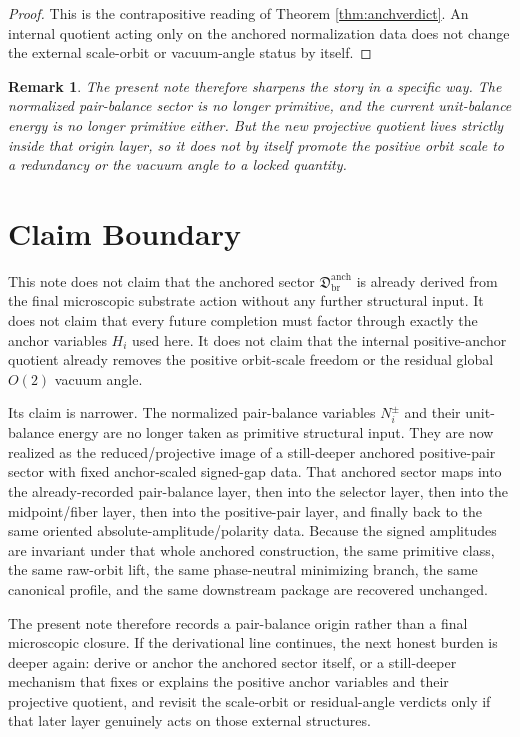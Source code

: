 \documentclass[11pt]{article}
\newcommand{\BalOriginSector}{\mathfrak D_{\mathrm{br}}^{\mathrm{anch}}}
\newtheorem{remark}{Remark}
\begin{document}
\begin{proof}
This is the contrapositive reading of Theorem \ref{thm:anchverdict}. An internal quotient acting only on the anchored normalization data does not change the external scale-orbit or vacuum-angle status by itself.
\end{proof}

\begin{remark}
The present note therefore sharpens the story in a specific way. The normalized pair-balance sector is no longer primitive, and the current unit-balance energy is no longer primitive either. But the new projective quotient lives strictly inside that origin layer, so it does not by itself promote the positive orbit scale to a redundancy or the vacuum angle to a locked quantity.
\end{remark}

\section{Claim Boundary}

This note does not claim that the anchored sector \(\BalOriginSector\) is already derived from the final microscopic substrate action without any further structural input. It does not claim that every future completion must factor through exactly the anchor variables \(H_i\) used here. It does not claim that the internal positive-anchor quotient already removes the positive orbit-scale freedom or the residual global \(O(2)\) vacuum angle.

Its claim is narrower. The normalized pair-balance variables \(N_i^\pm\) and their unit-balance energy are no longer taken as primitive structural input. They are now realized as the reduced/projective image of a still-deeper anchored positive-pair sector with fixed anchor-scaled signed-gap data. That anchored sector maps into the already-recorded pair-balance layer, then into the selector layer, then into the midpoint/fiber layer, then into the positive-pair layer, and finally back to the same oriented absolute-amplitude/polarity data. Because the signed amplitudes are invariant under that whole anchored construction, the same primitive class, the same raw-orbit lift, the same phase-neutral minimizing branch, the same canonical profile, and the same downstream package are recovered unchanged.

The present note therefore records a pair-balance origin rather than a final microscopic closure. If the derivational line continues, the next honest burden is deeper again: derive or anchor the anchored sector itself, or a still-deeper mechanism that fixes or explains the positive anchor variables and their projective quotient, and revisit the scale-orbit or residual-angle verdicts only if that later layer genuinely acts on those external structures.
\end{document}
